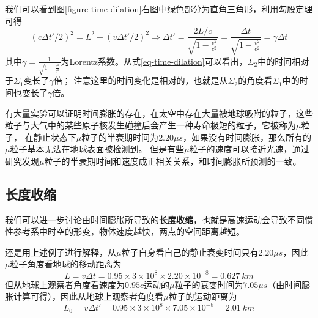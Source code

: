 \documentclass[12pt, a4paper, oneside]{ctexart}
\numberwithin{equation}{section}  %
\begin{document}
我们可以看到图\ref{figure-time-dilation}右图中绿色部分为直角三角形，利用勾股定理可得
\begin{equation}\label{eq-time-dilation}
    (c\Delta t'/2)^2 = L^2 + (v\Delta t'/2)^2\Rightarrow \Delta t' = \frac{2L/c}{\sqrt{1-\frac{v^2}{c^2}}} = \frac{\Delta t}{\sqrt{1-\frac{v^2}{c^2}}} = \gamma \Delta t
\end{equation}
其中$\gamma = \frac{1}{\sqrt{1-\frac{v^2}{c^2}}}$为Lorentz系数。从式\ref{eq-time-dilation}可以看出，$\Sigma_2$中的时间相对于$\Sigma_1$变长了$\gamma$倍；
注意这里的时间变化是相对的，也就是从$\Sigma_2$的角度看$\Sigma_1$中的时间也变长了$\gamma$倍。

有大量实验可以证明时间膨胀的存在，在太空中存在大量被地球吸附的粒子，这些粒子与大气中的某些原子核发生碰撞后会产生一种寿命极短的粒子，它被称为$\mu$粒子，
在静止状态下$\mu$粒子的半衰期时间为$2.20\mu s$，如果没有时间膨胀，那么所有的$\mu$粒子基本无法在地球表面被检测到。
但是有些$\mu$粒子的速度可以接近光速，通过研究发现$\mu$粒子的半衰期时间和速度成正相关关系，和时间膨胀所预测的一致。

\subsection{长度收缩}
我们可以进一步讨论由时间膨胀所导致的\textbf{长度收缩}，也就是高速运动会导致不同惯性参考系中时空的形变，物体速度越快，两点的空间距离越短。

还是用上述例子进行解释，从$\mu$粒子自身看自己的静止衰变时间只有$2.20\mu s$，因此$\mu$粒子角度看地球的移动距离为
\begin{equation}
    L = v\Delta t = 0.95\times 3\times 10^8\times 2.20\times 10^{-8} = 0.627\ km
\end{equation}
但从地球上观察者角度看速度为$0.95c$运动的$\mu$粒子的衰变时间为$7.05\mu s$（由时间膨胀计算可得），因此从地球上观察者角度看$\mu$粒子的运动距离为
\begin{equation}
    L_0 = v\Delta t' = 0.95\times 3\times 10^8\times 7.05\times 10^{-8} = 2.01\ km
\end{equation}
\end{document}
